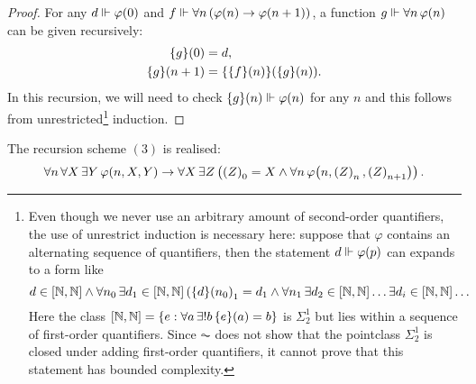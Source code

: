 \documentclass[11pt]{article}
\theoremstyle{plain}
\theoremstyle{definition}
\begin{document}
\begin{proof}
    For any $d \Vdash \varphi\mleft(0\mright)$ and $f \Vdash \forall n \left(\varphi\mleft(n\mright) \rightarrow \varphi\mleft(n + 1\mright)\right)$, a function $g \Vdash \forall n \, \varphi\mleft(n\mright)$ can be given recursively:
    \begin{align*}
        \mleft\{g\mright\}\mleft(0\mright)     & = d,                                                                                                    \\
        \mleft\{g\mright\}\mleft(n + 1\mright) & = \mleft\{\mleft\{f\mright\}\mleft(n\mright)\mright\}\mleft(\mleft\{g\mright\}\mleft(n\mright)\mright).
    \end{align*}
    In this recursion, we will need to check $\mleft\{g\mright\}\mleft(n\mright) \Vdash \varphi\mleft(n\mright)$ for any $n$ and this follows from unrestricted\footnote{Even though we never use an arbitrary amount of second-order quantifiers, the use of unrestrict induction is necessary here: suppose that $\varphi$ contains an alternating sequence of quantifiers, then the statement $d \Vdash \varphi\mleft(p\mright)$ can expands to a form like
        \[d \in \left[\mathbb{N}, \mathbb{N}\right] \land \forall n_0 \, \exists d_1 \in \left[\mathbb{N}, \mathbb{N}\right] \left(\mleft\{d\mright\}\mleft(n_0\mright)_1 = d_1 \land \forall n_1 \, \exists d_2 \in \left[\mathbb{N}, \mathbb{N}\right] \ldots \exists d_i \in \left[\mathbb{N}, \mathbb{N}\right] \ldots \right.\]
        Here the class $\left[\mathbb{N}, \mathbb{N}\right] = \left\{e : \forall a \, \exists! b \, \mleft\{e\mright\}\mleft(a\mright) = b\right\}$ is $\Sigma^1_2$ but lies within a sequence of first-order quantifiers. Since $\AC$ does not show that the pointclass $\Sigma^1_2$ is closed under adding first-order quantifiers, it cannot prove that this statement has bounded complexity.} induction.
\end{proof}

\begin{proposition}
    The recursion scheme $\left(3\right)$ is realised:
    \[\forall n \, \forall X \, \exists Y \, \varphi\mleft(n, X, Y\mright) \rightarrow \forall X \, \exists Z \left(\left(Z\right)_0 = X \land \forall n \, \varphi\mleft(n, \left(Z\right)_n, \left(Z\right)_{n + 1}\mright)\right).\]
\end{proposition}
\end{document}
